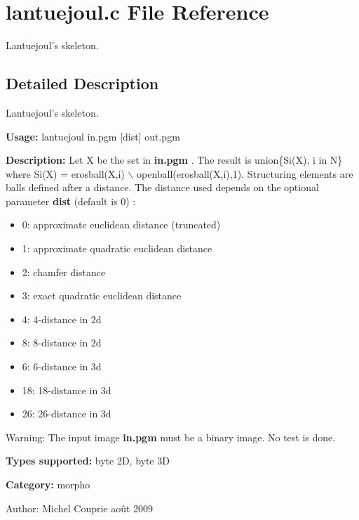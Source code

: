 \section{lantuejoul.c File Reference}
\label{lantuejoul_8c}
Lantuejoul's skeleton.  




\label{_details}
\subsection{Detailed Description}
Lantuejoul's skeleton. 

{\bf Usage:} lantuejoul in.pgm [dist] out.pgm

{\bf Description:} Let X be the set in {\bf in.pgm} . The result is union\{Si(X), i in N\} where Si(X) = erosball(X,i) $\backslash$ openball(erosball(X,i),1). Structuring elements are balls defined after a distance. The distance used depends on the optional parameter {\bf dist} (default is 0) : \begin{itemize}
\item 0: approximate euclidean distance (truncated) \item 1: approximate quadratic euclidean distance \item 2: chamfer distance \item 3: exact quadratic euclidean distance \item 4: 4-distance in 2d \item 8: 8-distance in 2d \item 6: 6-distance in 3d \item 18: 18-distance in 3d \item 26: 26-distance in 3d\end{itemize}
\begin{Desc}
\item[Warning:]The input image {\bf in.pgm} must be a binary image. No test is done.\end{Desc}
{\bf Types supported:} byte 2D, byte 3D

{\bf Category:} morpho

\begin{Desc}
\item[Author:]Michel Couprie août 2009 \end{Desc}
